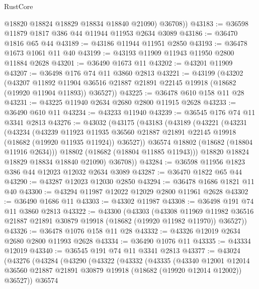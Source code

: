 \begin{lexlean}{RustCore}
\begin{coremodule}
          @18820
          @18824
          @18829
          @18834
          @18840
          @21090)
        @36708))
@43183 := @36598 @11879 @1817 @386 @44 @11944 @11953 @2634 @3089
@43186 := @36470 @1816 @65 @44
@43189 := @43186 @11944 @11951 @2850
@43193 := @36478 @1673 @1061 @11 @40
@43199 := @43193 @11909 @11943 @11950 @2800 @11884 @2628
@43201 := @36490 @1673 @11
@43202 := @43201 @11909
@43207 := @36498 @176 @74 @11 @3860 @2813
@43221 := @43199
    (@43202
      (@43207
        @11892
        @11904
        @36516
        @21887
        @21891
        @22145
        @19918
        (@18682 (@19920 @11904 @11893))
        @36527))
@43225 := @36478 @610 @158 @11 @28
@43231 := @43225 @11940 @2634 @2680 @2800 @11915 @2628
@43233 := @36490 @610 @11
@43234 := @43233 @11940
@43239 := @36545 @176 @74 @11 @3341 @2813
@43276 := @43032
    (@43175
      (@43183
        (@43189
          (@43221
            (@43231
              (@43234
                (@43239
                  @11923
                  @11935
                  @36560
                  @21887
                  @21891
                  @22145
                  @19918
                  (@18682 (@19920 @11935 @11924))
                  @36527))
              @36574
              @18802
              (@18682 (@18804 @11916 @2634)))
            @18802
            (@18682 (@18804 @11885 @11943)))
          @18820
          @18824
          @18829
          @18834
          @18840
          @21090)
        @36708))
@43284 := @36598 @11956 @1823 @386 @44 @12023 @12032 @2634 @3089
@43287 := @36470 @1822 @65 @44
@43290 := @43287 @12023 @12030 @2850
@43294 := @36478 @1686 @1821 @11 @40
@43300 := @43294 @11987 @12022 @12029 @2800 @11961 @2628
@43302 := @36490 @1686 @11
@43303 := @43302 @11987
@43308 := @36498 @191 @74 @11 @3860 @2813
@43322 := @43300
    (@43303
      (@43308
        @11969
        @11982
        @36516
        @21887
        @21891
        @30879
        @19918
        (@18682 (@19920 @11982 @11970))
        @36527))
@43326 := @36478 @1076 @158 @11 @28
@43332 := @43326 @12019 @2634 @2680 @2800 @11993 @2628
@43334 := @36490 @1076 @11
@43335 := @43334 @12019
@43340 := @36545 @191 @74 @11 @3341 @2813
@43377 := @43024
    (@43276
      (@43284
        (@43290
          (@43322
            (@43332
              (@43335
                (@43340
                  @12001
                  @12014
                  @36560
                  @21887
                  @21891
                  @30879
                  @19918
                  (@18682 (@19920 @12014 @12002))
                  @36527))
              @36574

\end{coremodule}
\end{lexlean}
